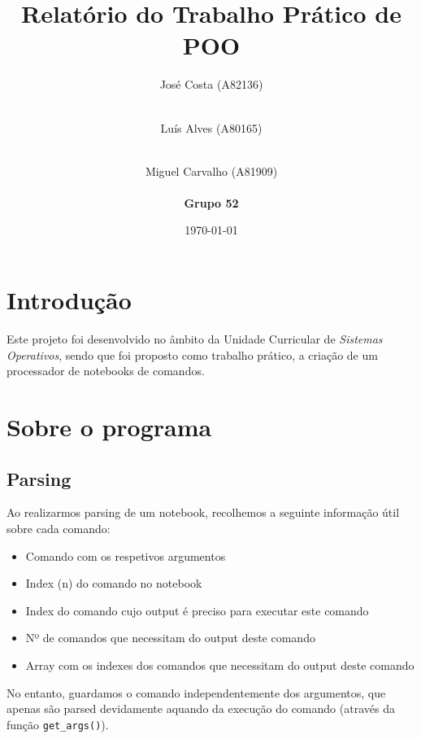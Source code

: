 \documentclass[a4paper]{article}
\begin{document}
\title{Relatório do Trabalho Prático de POO}
\author{
José Costa (A82136)\\\\
\and Luís Alves (A80165)\\\\
\and Miguel Carvalho (A81909)\\\\
\textbf{Grupo 52}
}
\date{\today}

\maketitle
\tableofcontents

\section{Introdução}

	\tab Este projeto foi desenvolvido no âmbito da Unidade Curricular de
	\textit{Sistemas Operativos}, sendo que foi proposto como trabalho
	prático, a criação de um processador de notebooks de comandos.

\section{Sobre o programa}

	\subsection{Parsing}
		\tab Ao realizarmos parsing de um notebook, recolhemos a seguinte informação
		útil sobre cada comando:
		\begin{itemize}
			\item Comando com os respetivos argumentos
			\item Index (n) do comando no notebook
			\item Index do comando cujo output é preciso para executar este comando
			\item Nº de comandos que necessitam do output deste comando
			\item Array com os indexes dos comandos que necessitam do output deste comando
		\end{itemize}
		\par No entanto, guardamos o comando independentemente dos argumentos, que apenas
		são parsed devidamente aquando da execução do comando (através da função \texttt{get\_args()}).
\end{document}
